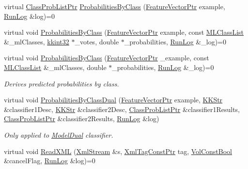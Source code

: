 \begin{DoxyCompactItemize}
virtual \hyperlink{namespace_k_k_m_l_l_a60f96a524ddb189eff2b4391cf0b651c}{Class\+Prob\+List\+Ptr} \hyperlink{class_k_k_m_l_l_1_1_model_a8d5638034838f63a5091978166d99d04}{Probabilities\+By\+Class} (\hyperlink{namespace_k_k_m_l_l_a0c5df3d48f45926fbc4fee04f5e3bc04}{Feature\+Vector\+Ptr} example, \hyperlink{class_k_k_b_1_1_run_log}{Run\+Log} \&log)=0
\item 
virtual void \hyperlink{class_k_k_m_l_l_1_1_model_ab0633c9d78133a4dafe1cf8f86a9f255}{Probabilities\+By\+Class} (\hyperlink{namespace_k_k_m_l_l_a0c5df3d48f45926fbc4fee04f5e3bc04}{Feature\+Vector\+Ptr} example, const \hyperlink{class_k_k_m_l_l_1_1_m_l_class_list}{M\+L\+Class\+List} \&\+\_\+ml\+Classes, \hyperlink{namespace_k_k_b_a8fa4952cc84fda1de4bec1fbdd8d5b1b}{kkint32} $\ast$\+\_\+votes, double $\ast$\+\_\+probabilities, \hyperlink{class_k_k_b_1_1_run_log}{Run\+Log} \&\+\_\+log)=0
\item 
virtual void \hyperlink{class_k_k_m_l_l_1_1_model_a7d67e85653e0bf4e60f20e5127fa97a2}{Probabilities\+By\+Class} (\hyperlink{namespace_k_k_m_l_l_a0c5df3d48f45926fbc4fee04f5e3bc04}{Feature\+Vector\+Ptr} \+\_\+example, const \hyperlink{class_k_k_m_l_l_1_1_m_l_class_list}{M\+L\+Class\+List} \&\+\_\+ml\+Classes, double $\ast$\+\_\+probabilities, \hyperlink{class_k_k_b_1_1_run_log}{Run\+Log} \&\+\_\+log)=0
\begin{DoxyCompactList}\small\item\em Derives predicted probabilities by class. \end{DoxyCompactList}\item 
virtual void \hyperlink{class_k_k_m_l_l_1_1_model_a290ddc0fe37384ff05ba32f88dc01384}{Probabilities\+By\+Class\+Dual} (\hyperlink{namespace_k_k_m_l_l_a0c5df3d48f45926fbc4fee04f5e3bc04}{Feature\+Vector\+Ptr} example, \hyperlink{class_k_k_b_1_1_k_k_str}{K\+K\+Str} \&classifier1\+Desc, \hyperlink{class_k_k_b_1_1_k_k_str}{K\+K\+Str} \&classifier2\+Desc, \hyperlink{namespace_k_k_m_l_l_a60f96a524ddb189eff2b4391cf0b651c}{Class\+Prob\+List\+Ptr} \&classifier1\+Results, \hyperlink{namespace_k_k_m_l_l_a60f96a524ddb189eff2b4391cf0b651c}{Class\+Prob\+List\+Ptr} \&classifier2\+Results, \hyperlink{class_k_k_b_1_1_run_log}{Run\+Log} \&log)
\begin{DoxyCompactList}\small\item\em Only applied to \hyperlink{class_k_k_m_l_l_1_1_model_dual}{Model\+Dual} classifier. \end{DoxyCompactList}\item 
virtual void \hyperlink{class_k_k_m_l_l_1_1_model_ab7f1d1441936048db8cec7e9ec987f34}{Read\+X\+ML} (\hyperlink{class_k_k_b_1_1_xml_stream}{Xml\+Stream} \&s, \hyperlink{namespace_k_k_b_a5f1b0b1667d79fec26deeff10c43df23}{Xml\+Tag\+Const\+Ptr} tag, \hyperlink{namespace_k_k_b_a7d390f568e2831fb76b86b56c87bf92f}{Vol\+Const\+Bool} \&cancel\+Flag, \hyperlink{class_k_k_b_1_1_run_log}{Run\+Log} \&log)=0

\end{DoxyCompactItemize}
